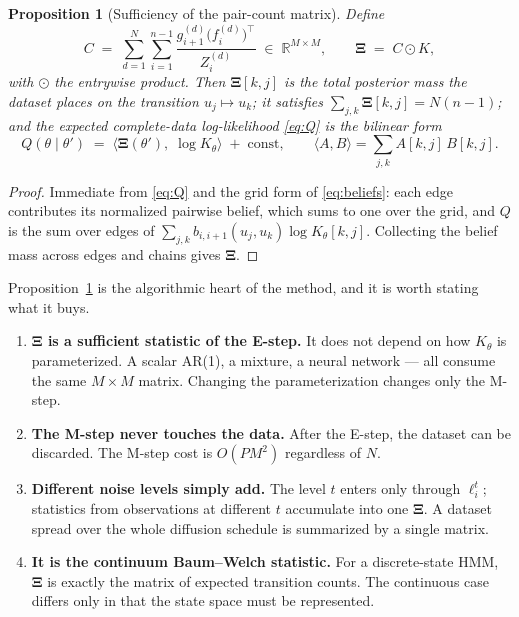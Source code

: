 \documentclass[11pt]{article}
\newtheorem{proposition}{Proposition}
\theoremstyle{remark}
\newcommand{\R}{\mathbb{R}}
\newcommand{\Xibf}{\bm{\Xi}}
\begin{document}
\begin{proposition}[Sufficiency of the pair-count matrix]
\label{prop:xi}
Define
\begin{equation}
  C \;=\; \sum_{d=1}^{N} \sum_{i=1}^{n-1}
          \frac{g^{(d)}_{i+1} \bigl(f^{(d)}_i\bigr)^{\!\top}}{Z^{(d)}_i}
  \;\in\; \R^{M \times M},
  \qquad
  \Xibf \;=\; C \odot K,
  \label{eq:xi}
\end{equation}
with $\odot$ the entrywise product. Then $\Xibf[k,j]$ is the total posterior
mass the dataset places on the transition $u_j \mapsto u_k$; it satisfies
$\sum_{j,k} \Xibf[k,j] = N(n-1)$; and the expected complete-data
log-likelihood \eqref{eq:Q} is the bilinear form
\begin{equation}
  Q(\theta \mid \theta') \;=\; \bigl\langle \Xibf(\theta'),\; \log K_\theta \bigr\rangle
  \;+\; \text{const},
  \qquad
  \langle A, B\rangle = \textstyle\sum_{j,k} A[k,j]\,B[k,j].
  \label{eq:Q-bilinear}
\end{equation}
\end{proposition}

\begin{proof}
Immediate from \eqref{eq:Q} and the grid form of \eqref{eq:beliefs}: each edge
contributes its normalized pairwise belief, which sums to one over the grid,
and $Q$ is the sum over edges of $\sum_{j,k} b_{i,i+1}(u_j,u_k)\log K_\theta[k,j]$.
Collecting the belief mass across edges and chains gives $\Xibf$.
\end{proof}

Proposition~\ref{prop:xi} is the algorithmic heart of the method, and it is
worth stating what it buys.

\begin{enumerate}[leftmargin=*]
\item \textbf{$\Xibf$ is a sufficient statistic of the E-step.} It does not
  depend on how $K_\theta$ is parameterized. A scalar AR(1), a mixture, a neural
  network --- all consume the same $M \times M$ matrix. Changing the
  parameterization changes only the M-step.
\item \textbf{The M-step never touches the data.} After the E-step, the dataset
  can be discarded. The M-step cost is $O(P M^2)$ regardless of $N$.
\item \textbf{Different noise levels simply add.} The level $t$ enters only
  through $\ell^t_i$; statistics from observations at different $t$ accumulate
  into one $\Xibf$. A dataset spread over the whole diffusion schedule is
  summarized by a single matrix.
\item \textbf{It is the continuum Baum--Welch statistic.} For a discrete-state
  HMM, $\Xibf$ is exactly the matrix of expected transition counts. The
  continuous case differs only in that the state space must be represented.
\end{enumerate}
\end{document}
